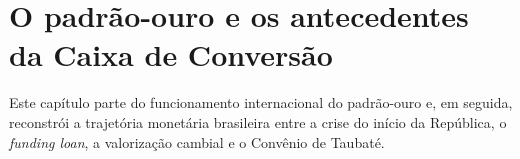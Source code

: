 \chapter{O padrão-ouro e os antecedentes da Caixa de Conversão}

Este capítulo parte do funcionamento internacional do padrão-ouro e, em seguida, reconstrói a trajetória monetária brasileira entre a crise do início da República, o \textit{funding loan}, a valorização cambial e o Convênio de Taubaté.



